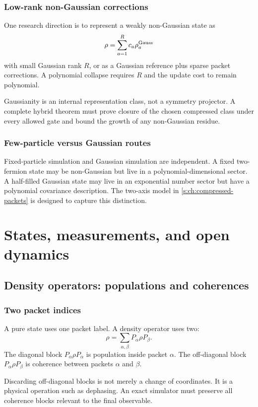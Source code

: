 \subsection{Low-rank non-Gaussian corrections}
One research direction is to represent a weakly non-Gaussian state as
\[
\rho
=
\sum_{a=1}^R c_a\rho_a^{\rm Gauss}
\]
with small Gaussian rank $R$, or as a Gaussian reference plus sparse packet corrections. A polynomial collapse requires $R$ and the update cost to remain polynomial.

\begin{frontierbox}
Gaussianity is an internal representation class, not a symmetry projector. A complete hybrid theorem must prove closure of the chosen compressed class under every allowed gate and bound the growth of any non-Gaussian residue.
\end{frontierbox}

\subsection{Few-particle versus Gaussian routes}
Fixed-particle simulation and Gaussian simulation are independent. A fixed two-fermion state may be non-Gaussian but live in a polynomial-dimensional sector. A half-filled Gaussian state may live in an exponential number sector but have a polynomial covariance description. The two-axis model in \cref{s:ch:compressed-packets} is designed to capture this distinction.

\chapter{States, measurements, and open dynamics}
\section{Density operators: populations and coherences}
\label{s:ch:density}

\subsection{Two packet indices}
A pure state uses one packet label. A density operator uses two:
\[
\rho
=
\sum_{\alpha,\beta}
P_\alpha\rho P_\beta.
\]
The diagonal block $P_\alpha\rho P_\alpha$ is population inside packet $\alpha$. The off-diagonal block $P_\alpha\rho P_\beta$ is coherence between packets $\alpha$ and $\beta$.

Discarding off-diagonal blocks is not merely a change of coordinates. It is a physical operation such as dephasing. An exact simulator must preserve all coherence blocks relevant to the final observable.


